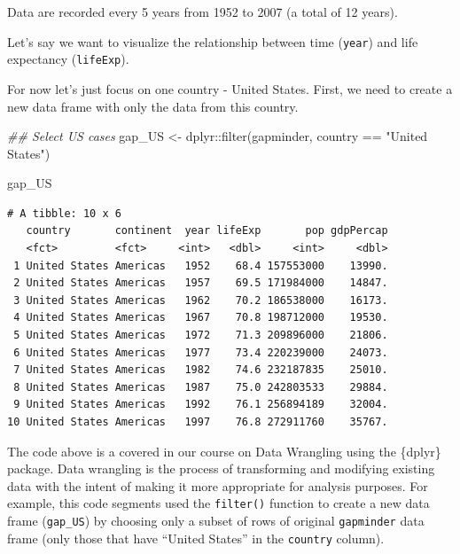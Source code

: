 \documentclass[
  letterpaper,
  DIV=11,
  numbers=noendperiod]{scrreprt}
\newenvironment{Shaded}{\begin{snugshade}}{\end{snugshade}}
\newcommand{\DocumentationTok}[1]{\textcolor[rgb]{0.37,0.37,0.37}{\textit{#1}}}
\newcommand{\FunctionTok}[1]{\textcolor[rgb]{0.28,0.35,0.67}{#1}}
\newcommand{\NormalTok}[1]{\textcolor[rgb]{0.00,0.23,0.31}{#1}}
\newcommand{\OtherTok}[1]{\textcolor[rgb]{0.00,0.23,0.31}{#1}}
\newcommand{\SpecialCharTok}[1]{\textcolor[rgb]{0.37,0.37,0.37}{#1}}
\newcommand{\StringTok}[1]{\textcolor[rgb]{0.13,0.47,0.30}{#1}}
\begin{document}
Data are recorded every 5 years from 1952 to 2007 (a total of 12 years).

Let's say we want to visualize the relationship between time
(\texttt{year}) and life expectancy (\texttt{lifeExp}).

For now let's just focus on one country - United States. First, we need
to create a new data frame with only the data from this country.

\begin{Shaded}
\begin{Highlighting}[]
\DocumentationTok{\#\# Select US cases}
\NormalTok{gap\_US }\OtherTok{\textless{}{-}}\NormalTok{ dplyr}\SpecialCharTok{::}\FunctionTok{filter}\NormalTok{(gapminder,}
\NormalTok{                        country }\SpecialCharTok{==} \StringTok{"United States"}\NormalTok{)}

\NormalTok{gap\_US}
\end{Highlighting}
\end{Shaded}

\begin{verbatim}
# A tibble: 10 x 6
   country       continent  year lifeExp       pop gdpPercap
   <fct>         <fct>     <int>   <dbl>     <int>     <dbl>
 1 United States Americas   1952    68.4 157553000    13990.
 2 United States Americas   1957    69.5 171984000    14847.
 3 United States Americas   1962    70.2 186538000    16173.
 4 United States Americas   1967    70.8 198712000    19530.
 5 United States Americas   1972    71.3 209896000    21806.
 6 United States Americas   1977    73.4 220239000    24073.
 7 United States Americas   1982    74.6 232187835    25010.
 8 United States Americas   1987    75.0 242803533    29884.
 9 United States Americas   1992    76.1 256894189    32004.
10 United States Americas   1997    76.8 272911760    35767.
\end{verbatim}

\begin{tcolorbox}[enhanced jigsaw, titlerule=0mm, colback=white, left=2mm, breakable, opacitybacktitle=0.6, colbacktitle=quarto-callout-note-color!10!white, colframe=quarto-callout-note-color-frame, bottomtitle=1mm, opacityback=0, coltitle=black, arc=.35mm, toptitle=1mm, title=\textcolor{quarto-callout-note-color}{\faInfo}\hspace{0.5em}{Reminder}, leftrule=.75mm, toprule=.15mm, bottomrule=.15mm, rightrule=.15mm]

The code above is a covered in our course on Data Wrangling using the
\{dplyr\} package. Data wrangling is the process of transforming and
modifying existing data with the intent of making it more appropriate
for analysis purposes. For example, this code segments used the
\texttt{filter()} function to create a new data frame (\texttt{gap\_US})
by choosing only a subset of rows of original \texttt{gapminder} data
frame (only those that have ``United States'' in the \texttt{country}
column).

\end{tcolorbox}
\end{document}
